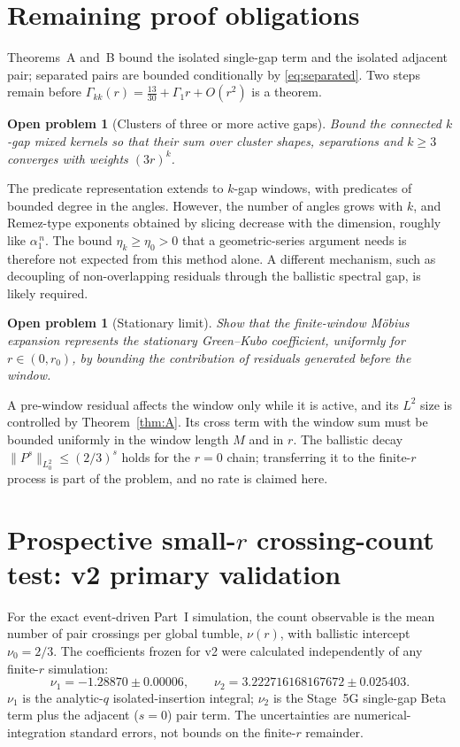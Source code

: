 \documentclass[11pt]{article}
\newtheorem{problem}[theorem]{Open problem}
\theoremstyle{remark}\newtheorem{remark}[theorem]{Remark}
\begin{document}
\section{Remaining proof obligations}\label{sec:open}
Theorems~A and~B bound the isolated single-gap term and the isolated adjacent pair; separated pairs are bounded conditionally by \eqref{eq:separated}. Two steps remain before $\Gamma_{kk}(r)=\tfrac{13}{30}+\Gamma_1r+O(r^2)$ is a theorem.

\begin{problem}[Clusters of three or more active gaps]
Bound the connected $k$-gap mixed kernels so that their sum over cluster shapes, separations and $k\ge3$ converges with weights $(3r)^k$.
\end{problem}
\noindent The predicate representation extends to $k$-gap windows, with predicates of bounded degree in the angles. However, the number of angles grows with $k$, and Remez-type exponents obtained by slicing decrease with the dimension, roughly like $\alpha_1^{\,n}$. The bound $\eta_k\ge\eta_0>0$ that a geometric-series argument needs is therefore not expected from this method alone. A different mechanism, such as decoupling of non-overlapping residuals through the ballistic spectral gap, is likely required.

\begin{problem}[Stationary limit]
Show that the finite-window M\"obius expansion represents the stationary Green--Kubo coefficient, uniformly for $r\in(0,r_0)$, by bounding the contribution of residuals generated before the window.
\end{problem}
\noindent A pre-window residual affects the window only while it is active, and its $L^2$ size is controlled by Theorem~\ref{thm:A}. Its cross term with the window sum must be bounded uniformly in the window length $M$ and in $r$. The ballistic decay $\|P^s\|_{L^2_0}\le(2/3)^s$ holds for the $r=0$ chain; transferring it to the finite-$r$ process is part of the problem, and no rate is claimed here.

\section{Prospective small-$r$ crossing-count test: v2 primary validation}
For the exact event-driven Part~I simulation, the count observable is the mean number of pair crossings per global tumble, $\nu(r)$, with ballistic intercept $\nu_0=2/3$. The coefficients frozen for v2 were calculated independently of any finite-$r$ simulation:
\[
\nu_1=-1.28870\pm0.00006,\qquad \nu_2=3.222716168167672\pm0.025403 .
\]
$\nu_1$ is the analytic-$q$ isolated-insertion integral; $\nu_2$ is the Stage~5G single-gap Beta term plus the adjacent ($s=0$) pair term. The uncertainties are numerical-integration standard errors, not bounds on the finite-$r$ remainder.
\end{document}
